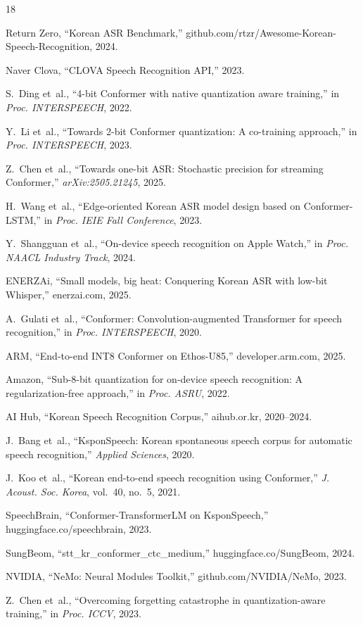 \documentclass[a4paper,11pt,twocolumn]{article}
\begin{document}

\begin{thebibliography}{18}

Return Zero, ``Korean ASR Benchmark,'' github.com/rtzr/Awesome-Korean-Speech-Recognition, 2024.

Naver Clova, ``CLOVA Speech Recognition API,'' 2023.

S.~Ding et~al., ``4-bit Conformer with native quantization aware training,'' in \textit{Proc. INTERSPEECH}, 2022.

Y.~Li et~al., ``Towards 2-bit Conformer quantization: A co-training approach,'' in \textit{Proc. INTERSPEECH}, 2023.

Z.~Chen et~al., ``Towards one-bit ASR: Stochastic precision for streaming Conformer,'' \textit{arXiv:2505.21245}, 2025.

H.~Wang et~al., ``Edge-oriented Korean ASR model design based on Conformer-LSTM,'' in \textit{Proc. IEIE Fall Conference}, 2023.

Y.~Shangguan et~al., ``On-device speech recognition on Apple Watch,'' in \textit{Proc. NAACL Industry Track}, 2024.

ENERZAi, ``Small models, big heat: Conquering Korean ASR with low-bit Whisper,'' enerzai.com, 2025.

A.~Gulati et~al., ``Conformer: Convolution-augmented Transformer for speech recognition,'' in \textit{Proc. INTERSPEECH}, 2020.

ARM, ``End-to-end INT8 Conformer on Ethos-U85,'' developer.arm.com, 2025.

Amazon, ``Sub-8-bit quantization for on-device speech recognition: A regularization-free approach,'' in \textit{Proc. ASRU}, 2022.

AI Hub, ``Korean Speech Recognition Corpus,'' aihub.or.kr, 2020--2024.

J.~Bang et~al., ``KsponSpeech: Korean spontaneous speech corpus for automatic speech recognition,'' \textit{Applied Sciences}, 2020.

J.~Koo et~al., ``Korean end-to-end speech recognition using Conformer,'' \textit{J. Acoust. Soc. Korea}, vol.~40, no.~5, 2021.

SpeechBrain, ``Conformer-TransformerLM on KsponSpeech,'' huggingface.co/speechbrain, 2023.

SungBeom, ``stt\_kr\_conformer\_ctc\_medium,'' huggingface.co/SungBeom, 2024.

NVIDIA, ``NeMo: Neural Modules Toolkit,'' github.com/NVIDIA/NeMo, 2023.

Z.~Chen et~al., ``Overcoming forgetting catastrophe in quantization-aware training,'' in \textit{Proc. ICCV}, 2023.

\end{thebibliography}
\end{document}

